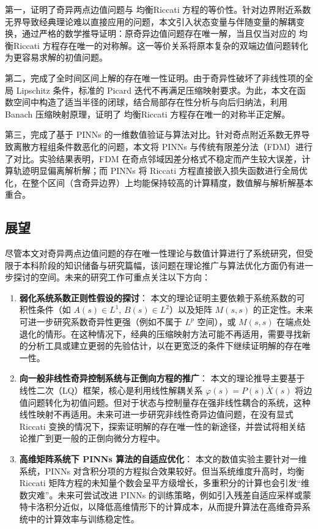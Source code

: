 \documentclass{GZUbachelorthesis}
\begin{document}
第一，证明了奇异两点边值问题与 均衡Riccati 方程的等价性。针对边界附近系数无界导致经典理论难以直接应用的问题，本文引入状态变量与伴随变量的解耦变换，通过严格的数学推导证明：原奇异边值问题存在唯一解，当且仅当对应的 均衡Riccati 方程存在唯一的对称解。这一等价关系将原本复杂的双端边值问题转化为更容易求解的初值问题。

第二，完成了全时间区间上解的存在唯一性证明。由于奇异性破坏了非线性项的全局 Lipschitz 条件，标准的 Picard 迭代不再满足压缩映射要求。为此，本文在函数空间中构造了适当半径的闭球，结合局部存在性分析与向后归纳法，利用 Banach 压缩映射原理，证明了 均衡Riccati 方程存在唯一的对称半正定解。

第三，完成了基于 PINNs 的一维数值验证与算法对比。针对奇点附近系数无界导致离散方程组条件数恶化的问题，本文将 PINNs 与传统有限差分法（FDM）进行了对比。实验结果表明，FDM 在奇点邻域因差分格式不稳定而产生较大误差，计算轨迹明显偏离解析解；而 PINNs 将 Riccati 方程直接嵌入损失函数进行全局优化，在整个区间（含奇异边界）上均能保持较高的计算精度，数值解与解析解基本重合。
\subsection{展望}

尽管本文对奇异两点边值问题的存在唯一性理论与数值计算进行了系统研究，但受限于本科阶段的知识储备与研究篇幅，该问题在理论推广与算法优化方面仍有进一步探讨的空间。未来的研究工作可重点关注以下方向：

\begin{enumerate}
	\item \textbf{弱化系统系数正则性假设的探讨}：
	本文的理论证明主要依赖于系统系数的可积性条件（如 $A(s) \in L^1$, $B(s) \in L^2$）以及矩阵 $M(s,s)$ 的正定性。未来可进一步研究系数奇异性更强（例如不属于 $L^p$ 空间），或 $M(s,s)$ 在端点处退化的情形。在这种情况下，经典的压缩映射方法可能不再适用，需要寻找新的分析工具或建立更弱的先验估计，以在更宽泛的条件下继续证明解的存在唯一性。
	
	\item \textbf{向一般非线性奇异控制系统与正倒向方程的推广}：
	本文的理论推导主要基于线性二次（LQ）框架，核心是利用线性解耦关系 $\varphi(s) = P(s)\bar{X}(s)$ 将边值问题转化为初值问题。但对于状态与控制量存在强非线性耦合的系统，这种线性映射不再适用。未来可进一步研究非线性奇异边值问题，在没有显式 Riccati 变换的情况下，探索证明解的存在唯一性的新途径，并尝试将相关结论推广到更一般的正倒向微分方程中。
	
	\item \textbf{高维矩阵系统下 PINNs 算法的自适应优化}：
	本文的数值实验主要针对一维系统，PINNs 对含积分项的方程拟合效果较好。但当系统维度升高时，均衡Riccati 矩阵方程的未知量个数会呈平方级增长，多重积分的计算也会引发“维数灾难”。未来可尝试改进 PINNs 的训练策略，例如引入残差自适应采样或蒙特卡洛积分近似，以降低高维情形下的计算成本，从而提升算法在高维奇异系统中的计算效率与训练稳定性。
\end{enumerate}
\end{document}
